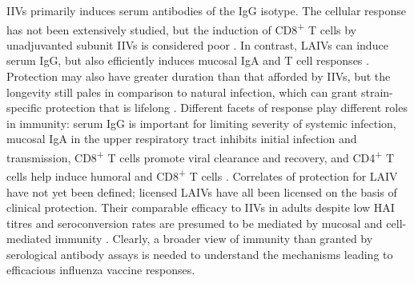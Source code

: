 \Glspl{IIV} primarily induces serum antibodies of the IgG isotype.
The cellular response has not been extensively studied,
but the induction of CD8\textsuperscript{+} T cells by unadjuvanted subunit \glspl{IIV} is considered poor \autocite{bresee2018InactivatedInfluenzaVaccines,koutsakos2018CirculatingFHCells}.
In contrast, \glspl{LAIV} can induce serum IgG, but also efficiently induces mucosal IgA and T cell responses \autocite{luke2018InfluenzaVaccineLive}.
Protection may also have greater duration than that afforded by \glspl{IIV}, 
but the longevity still pales in comparison to natural infection, which can grant strain-specific protection that is lifelong \autocite{houser2015InfluenzaVaccinesChallenges,bresee2018InactivatedInfluenzaVaccines,luke2018InfluenzaVaccineLive,krammer2019HumanAntibodyResponse}.
Different facets of response play different roles in immunity:
serum IgG is important for limiting severity of systemic infection, 
mucosal IgA in the upper respiratory tract inhibits initial infection and transmission, 
CD8\textsuperscript{+} T cells promote viral clearance and recovery,
and CD4\textsuperscript{+} T cells help induce humoral and CD8\textsuperscript{+} T cells
\textcite{renegar2004RoleIgAIgG,sano2017RoadMoreEffective,krammer2018Influenza,bresee2018InactivatedInfluenzaVaccines}.
Correlates of protection for \gls{LAIV} have not yet been defined;
licensed \glspl{LAIV} have all been licensed on the basis of clinical protection.
Their comparable efficacy to \glspl{IIV} in adults despite low \gls{HAI} titres and seroconversion rates are presumed to be mediated by mucosal and cell-mediated immunity \autocite{luke2018InfluenzaVaccineLive,krammer2019HumanAntibodyResponse}.
%
Clearly, a broader view of immunity than granted by serological antibody assays is needed to understand the mechanisms leading to efficacious influenza vaccine responses.


